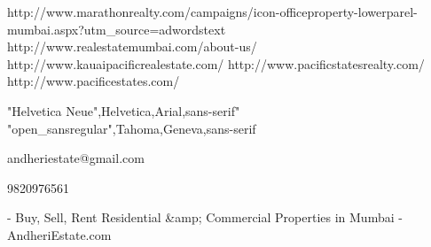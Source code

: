 http://www.marathonrealty.com/campaigns/icon-officeproperty-lowerparel-mumbai.aspx?utm_source=adwordstext
http://www.realestatemumbai.com/about-us/
http://www.kauaipacificrealestate.com/
http://www.pacificstatesrealty.com/
http://www.pacificestates.com/


"Helvetica Neue",Helvetica,Arial,sans-serif"
"open_sansregular",Tahoma,Geneva,sans-serif

andheriestate@gmail.com

9820976561

- Buy, Sell, Rent Residential &amp; Commercial Properties in Mumbai - AndheriEstate.com
